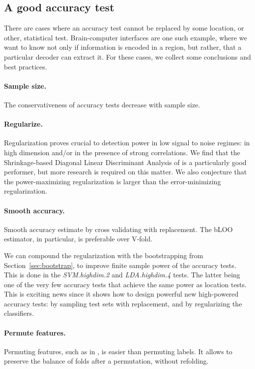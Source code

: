 \documentclass[12pt,a4paper]{article}
\begin{document}
\subsection{A good accuracy test}
There are cases where an accuracy test cannot be replaced by some location, or other, statistical test. 
Brain-computer interfaces are one such example, where we want to know not only if information is encoded in a region, but rather, that a particular decoder can extract it. 
For these cases, we collect some conclusions and best practices. 


\paragraph{Sample size.} The conservativeness of accuracy tests decrease with sample size. 


\paragraph{Regularize.}
Regularization proves crucial to detection power in low signal to noise regimes: in high dimension and\slash or in the presence of strong correlations. 
We find that the Shrinkage-based Diagonal Linear Discriminant Analysis of \cite{pang_shrinkage-based_2009} is a particularly good performer, but more research is required on this matter. 
We also conjecture that the power-maximizing regularization is larger than the error-minimizing regularization.

\paragraph{Smooth accuracy.}
Smooth accuracy estimate by cross validating with replacement. The bLOO estimator, in particular, is preferable over V-fold.

We can compound the regularization with the bootstrapping from Section~\ref{sec:bootstrap}, to improve finite sample power of the accuracy tests. 
This is done in the \emph{SVM.highdim.2} and \emph{LDA.highdim.4} tests. 
The latter being one of the very few accuracy tests that achieve the same power as location tests. 
This is exciting news since it shows how to design powerful new high-powered accuracy tests: by sampling test sets with replacement, and by regularizing the classifiers. 


\paragraph{Permute features.} Permuting features, such as in \cite{golland_permutation_2005}, is easier than permuting labels. 
It allows to preserve the balance of folds after a permutation, without refolding.
\end{document}
